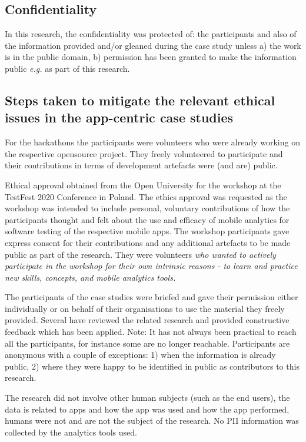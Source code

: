 \subsection{Confidentiality}
In this research, the confidentiality was protected of: the participants and also of the information provided and/or gleaned during the case study unless a) the work is in the public domain, b) permission has been granted to make the information public \textit{e.g.} as part of this research.

\subsection{Steps taken to mitigate the relevant ethical issues in the app-centric case studies}
For the hackathons the participants were volunteers who were already working on the respective opensource project. They freely volunteered to participate and their contributions in terms of development artefacts were (and are) public. 

Ethical approval obtained from the Open University for the workshop at the TestFest 2020 Conference in Poland. The ethics approval was requested as the workshop was intended to include personal, voluntary contributions of how the participants thought and felt about the use and efficacy of mobile analytics for software testing of the respective mobile apps. The workshop participants gave express consent for their contributions and any additional artefacts to be made public as part of the research. They were volunteers \textit{who wanted to actively participate in the workshop for their own intrinsic reasons - to learn and practice new skills, concepts, and mobile analytics tools.}

The participants of the case studies were briefed and gave their permission either individually or on behalf of their organisations to use the material they freely provided. Several have reviewed the related research and provided constructive feedback which has been applied. 
Note: It has not always been practical to reach all the participants, for instance some are no longer reachable.
%
Participants are anonymous with a couple of exceptions: 1) when the information is already public, 2) where they were happy to be identified in public as contributors to this research.  

The research did not involve other human subjects (such as the end users), the data is related to apps and how the app was used and how the app performed, humans were not and are not the subject of the research. No PII information was collected by the analytics tools used.

